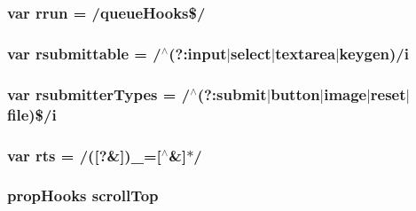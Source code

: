 \hypertarget{jquery-1_810_82_8js_acf9d5e6b315eca81eb432bb6ee280a2e}{
\subsubsection[{rrun}]{\setlength{\rightskip}{0pt plus 5cm}var rrun = /queue\-Hooks\$/}}\label{jquery-1_810_82_8js_acf9d5e6b315eca81eb432bb6ee280a2e}
\hypertarget{jquery-1_810_82_8js_a12d248d7e6c5985c5ea21f56fbef9e90}{
\subsubsection[{rsubmittable}]{\setlength{\rightskip}{0pt plus 5cm}var rsubmittable = /$^\wedge$(?\-:input$\vert${\bf select}$\vert$textarea$\vert$keygen)/i}}\label{jquery-1_810_82_8js_a12d248d7e6c5985c5ea21f56fbef9e90}
\hypertarget{jquery-1_810_82_8js_a0e9cd4ca08945afe827846f34a36c74a}{
\subsubsection[{rsubmitter\-Types}]{\setlength{\rightskip}{0pt plus 5cm}var rsubmitter\-Types = /$^\wedge$(?\-:{\bf submit}$\vert${\bf button}$\vert$image$\vert$reset$\vert$file)\$/i}}\label{jquery-1_810_82_8js_a0e9cd4ca08945afe827846f34a36c74a}
\hypertarget{jquery-1_810_82_8js_a38ff30904f54277281a13514d7aea00d}{
\subsubsection[{rts}]{\setlength{\rightskip}{0pt plus 5cm}var rts = /(\mbox{[}?\&\mbox{]})\-\_\-=\mbox{[}$^\wedge$\&\mbox{]}$\ast$/}}\label{jquery-1_810_82_8js_a38ff30904f54277281a13514d7aea00d}
\hypertarget{jquery-1_810_82_8js_a57beb1f611d6c8b84919b0f7d9e0e890}{
\subsubsection[{scroll\-Top}]{ {\bf prop\-Hooks} scroll\-Top}}\label{jquery-1_810_82_8js_a57beb1f611d6c8b84919b0f7d9e0e890}
